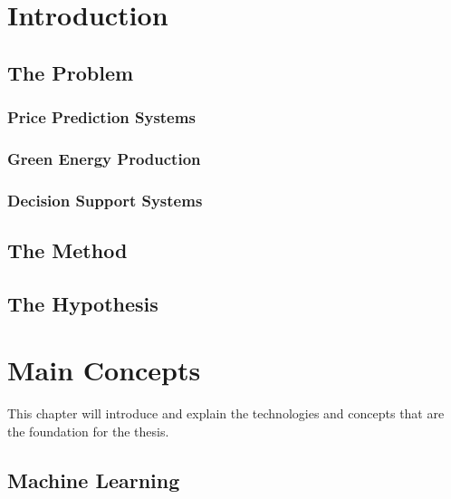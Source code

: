 \documentclass[twoside,11pt,openright]{report}
\begin{document}

\chapter{Introduction}
\label{ch:intro}
\section{The Problem}


\subsection{Price Prediction Systems}


\subsection{Green Energy Production}



\subsection{Decision Support Systems}


\section{The Method}


\section{The Hypothesis}




\chapter{Main Concepts}
This chapter will introduce and explain the technologies and concepts that are the foundation for the thesis.
\label{ch:foundations}
\section{Machine Learning}

\end{document}
